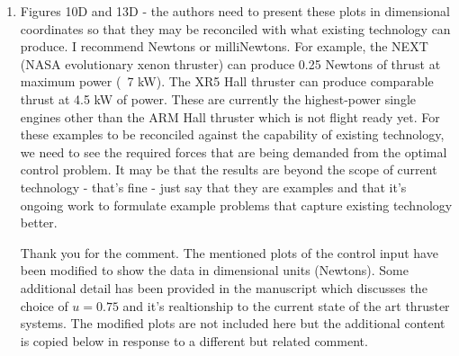 \documentclass[11pt]{article}
\begin{document}
\begin{enumerate}
\item
    \begin{itshape}
Figures 10D and 13D - the authors need to present these plots in dimensional coordinates so that they may be reconciled with what existing technology can produce.  I recommend Newtons or milliNewtons.  For example, the NEXT (NASA evolutionary xenon thruster) can produce 0.25 Newtons of thrust at maximum power (~7 kW).  The XR5 Hall thruster can produce comparable thrust at 4.5 kW of power.  These are currently the highest-power single engines other than the ARM Hall thruster which is not flight ready yet.  For these examples to be reconciled against the capability of existing technology, we need to see the required forces that are being demanded from the optimal control problem.  It may be that the results are beyond the scope of current technology - that's fine - just say that they are examples and that it's ongoing work to formulate example problems that capture existing technology better.
\end{itshape}

Thank you for the comment.
The mentioned plots of the control input have been modified to show the data in dimensional units (Newtons). 
Some additional detail has been provided in the manuscript which discusses the choice of \( u = 0.75 \) and it's realtionship to the current state of the art thruster systems.
The modified plots are not included here but the additional content is copied below in response to a different but related comment.


\end{enumerate}
\end{document}
